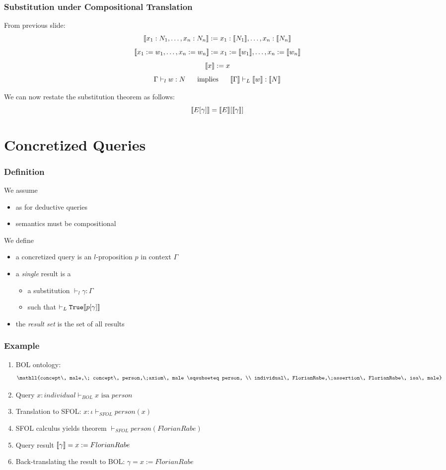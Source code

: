 \begin{frame}\frametitle{Substitution under Compositional Translation}
From previous slide:
\[\llbracket x_1:N_1,\ldots,x_n:N_n\rrbracket:=x_1:\llbracket N_1\rrbracket,\ldots,x_n:\llbracket N_n\rrbracket\]
\[\llbracket x_1:=w_1,\ldots,x_n:=w_n\rrbracket:=x_1:=\llbracket w_1\rrbracket,\ldots,x_n:=\llbracket w_n\rrbracket\]
\[\llbracket x\rrbracket:=x\]
\[\Gamma\vdash_l w:N \hspace*{.5cm}\;\mathrm{implies}\;\hspace*{.5cm} \llbracket \Gamma\rrbracket\vdash_L \llbracket w\rrbracket:\llbracket N\rrbracket\]

We can now restate the substitution theorem as follows:
  \[\llbracket E[\gamma]\rrbracket=\llbracket E\rrbracket[\llbracket \gamma\rrbracket]\]
\end{frame}

\section{Concretized Queries}

\begin{frame}\frametitle{Definition}
We assume
\begin{itemize}
\item as for deductive queries
\item semantics must be compositional
\end{itemize}

We define
\begin{itemize}
\item a concretized query is an $l$-proposition $p$ in context $\Gamma$
\item a \emph{single} result is a
 \begin{itemize}
 \item a substitution $\vdash_l \gamma:\Gamma$
 \item such that $\vdash_L \mathtt{True} \llbracket p[\gamma]\rrbracket$
 \end{itemize}
\item the \emph{result set} is the set of all results
\end{itemize}
\end{frame}

\begin{frame}\frametitle{Example}
\begin{enumerate}
\item BOL ontology:
\[\mathll{concept\, male,\; concept\, person,\;axiom\, male \sqsubseteq person, \\
  individual\, FlorianRabe,\;assertion\, FlorianRabe\, isa\, male}\]
\item Query $x:individual\vdash_{BOL}x \text{ isa } person$
\item Translation to SFOL: $x:\iota\vdash_{SFOL} person(x)$
\item SFOL calculus yields theorem $\vdash_{SFOL}person(FlorianRabe)$
\item Query result $\llbracket \gamma\rrbracket= x:= FlorianRabe$
\item Back-translating the result to BOL: $\gamma= x:= FlorianRabe$
\end{enumerate}
\end{frame}


